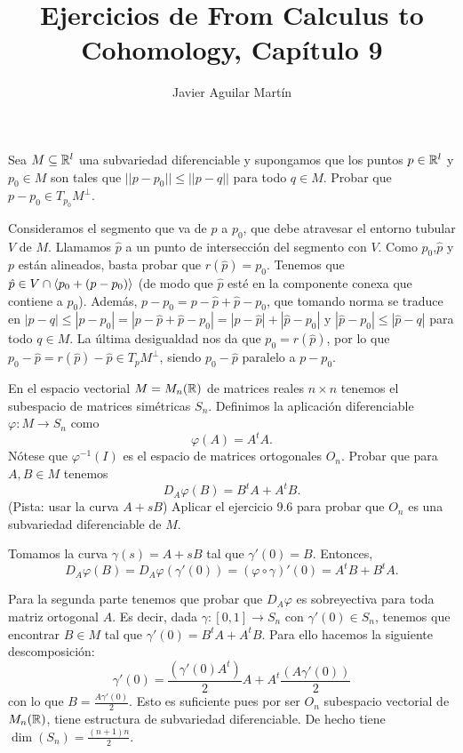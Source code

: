 \documentclass[twoside]{article}
\begin{document}
\title{Ejercicios de From Calculus to Cohomology, Capítulo 9}
\author{Javier Aguilar Martín}
\maketitle

\begin{ejercicio}{9.1}
Sea $M\subseteq\mathbb{R}^l$ una subvariedad diferenciable y supongamos que los puntos $p\in\mathbb{R}^l$ y $p_0\in M$ son tales que $||p-p_0||\leq ||p-q||$ para todo $q\in M$. Probar que $p-p_0\in T_{p_0}M^{\perp}$.
\end{ejercicio}
\begin{solucion}
Consideramos el segmento que va de $p$ a $p_0$, que debe atravesar el entorno tubular $V$ de $M$. Llamamos $\hat{p}$ a un punto de intersección del segmento con $V$. Como $p_0$,$\hat{p}$ y $p$ están alineados, basta probar que $r(\hat{p})=p_0$. Tenemos que $\hat{p}\in V\cap \langle{p_0+(p-p_0)}\rangle$ (de modo que $\hat{p}$ esté en la componente conexa que contiene a $p_0$). Además, $p-p_0=p-\hat{p}+\hat{p}-p_0$, que tomando norma se traduce en $|p-q|\leq |p-p_0|=|p-\hat{p}+\hat{p}-p_0|=|p-\hat{p}|+|\hat{p}-p_0|$ y $|\hat{p}-p_0|\leq |\hat{p}-q|$ para todo $q\in M$. La última desigualdad nos da que $p_0=r(\hat{p})$, por lo que $p_0-\hat{p}=r(\hat{p})-\hat{p}\in T_pM^{\perp}$, siendo $p_0-\hat{p}$ paralelo a $p-p_0$.



\end{solucion}
\newpage


\begin{ejercicio}{9.9}
En el espacio vectorial $M=M_n(\mathbb{R})$ de matrices reales $n\times n$ tenemos el subespacio de matrices simétricas $S_n$. Definimos la aplicación diferenciable $\varphi:M\to S_n$ como 
\[
\varphi(A)=A^tA.
\]
Nótese que $\varphi^{-1}(I)$ es el espacio de matrices ortogonales $O_n$. Probar que para $A,B\in M$ tenemos
\[
D_A\varphi(B)=B^tA+A^tB.
\]
(Pista: usar la curva $A+sB$)
Aplicar el ejercicio 9.6 para probar que $O_n$ es una subvariedad diferenciable de $M$.
\end{ejercicio}
\begin{solucion}
Tomamos la curva $\gamma(s)=A+sB$ tal que $\gamma'(0)=B$. Entonces, 
\[
D_A\varphi(B)=D_A\varphi(\gamma'(0))=(\varphi\circ\gamma)'(0)=A^tB+B^tA.
\]

Para la segunda parte tenemos que probar que $D_A\varphi$ es sobreyectiva para toda matriz ortogonal $A$. Es decir, dada $\gamma:[0,1]\to S_n$ con $\gamma'(0)\in S_n$, tenemos que encontrar $B\in M$ tal que $\gamma'(0)=B^tA+A^tB$. Para ello hacemos la siguiente descomposición:
\[
\gamma'(0)=\frac{(\gamma'(0)A^t)}{2}A+A^t\frac{(A\gamma'(0))}{2}
\]
con lo que $B=\frac{A\gamma'(0)}{2}$.
Esto es suficiente pues por ser $O_n$ subespacio vectorial de $M_n(\mathbb{R})$, tiene estructura de subvariedad diferenciable. De hecho tiene $\dim(S_n)=\frac{(n+1)n}{2}$.
\end{solucion}
\newpage
\end{document}
